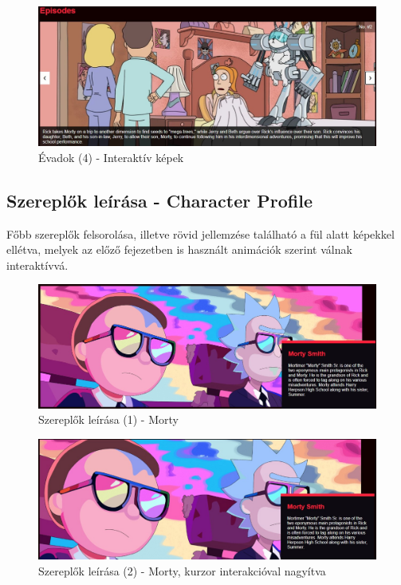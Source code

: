 \documentclass[12pt, titlepage]{article}
\begin{document}
\begin{figure}[!h]
	\centering
	\includegraphics[width=\linewidth]{images/seasons/4.jpg}
	\caption{Évadok (4) - Interaktív képek}
\end{figure}

\pagebreak

\subsection{Szereplők leírása - Character Profile}
Főbb szereplők felsorolása, illetve rövid jellemzése található a fül alatt képekkel ellétva, melyek az előző fejezetben is használt animációk szerint válnak interaktívvá.

\begin{figure}[!h]
	\centering
	\includegraphics[width=\linewidth]{images/characters/1.jpg}
	\caption{Szereplők leírása (1) - Morty}
\end{figure}

\begin{figure}[!h]
	\centering
	\includegraphics[width=\linewidth]{images/characters/2.jpg}
	\caption{Szereplők leírása (2) - Morty, kurzor interakcióval nagyítva}
\end{figure}
\end{document}
